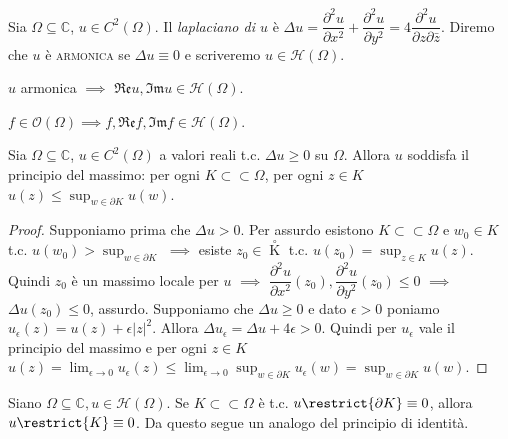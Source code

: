 \begin{defn}
  Sia $\Omega \subseteq \mathbb{C}$, $u \in C^2(\Omega)$. Il \textit{laplaciano di $u$} è $\Delta u=\dfrac{\partial^2 u}{\partial x^2}+\dfrac{\partial^2 u}{\partial y^2}=4\dfrac{\partial^2 u}{\partial z\partial\bar{z}}$.
  Diremo che $u$ è \textsc{armonica} se $\Delta u \equiv 0$ e scriveremo $u \in \mathcal{H}(\Omega)$.
\end{defn}

\begin{oss}
  $u$ armonica $\implies$ $\mathfrak{Re}u, \mathfrak{Im}u \in \mathcal{H}(\Omega)$.
\end{oss}

\begin{oss}
  $f \in \mathcal{O}(\Omega) \implies f, \mathfrak{Re}f, \mathfrak{Im}f \in \mathcal{H}(\Omega)$.
\end{oss}

\begin{prop}
  Sia $\Omega \subseteq \mathbb{C}$, $u \in C^2(\Omega)$ a valori reali t.c. $\Delta u \ge 0$ su $\Omega$. Allora $u$ soddisfa il principio del massimo: per ogni $K \subset\subset \Omega$, per ogni $z \in K$ $\displaystyle u(z) \le \sup_{w \in \partial K} u(w)$.
\end{prop}

\begin{proof}
  Supponiamo prima che $\Delta u>0$. Per assurdo esistono $K\subset\subset\Omega$ e $w_0 \in K$ t.c. $\displaystyle u(w_0)>\sup_{w \in \partial K}$ $\implies$ esiste $z_0 \in \mathop K\limits^ \circ$ t.c. $\displaystyle u(z_0)=\sup_{z \in K} u(z)$.
  Quindi $z_0$ è un massimo locale per $u$ $\implies$ $\dfrac{\partial^2 u}{\partial x^2}(z_0), \dfrac{\partial^2 u}{\partial y^2}(z_0) \le 0$ $\implies$ $\Delta u(z_0) \le 0$, assurdo.
  Supponiamo che $\Delta u \ge 0$ e dato $\epsilon>0$ poniamo $u_\epsilon(z)=u(z)+\epsilon|z|^2$. Allora $\Delta u_\epsilon=\Delta u +4\epsilon>0$. Quindi per $u_\epsilon$ vale il principio del massimo e per ogni $z \in K$ $\displaystyle u(z)=\lim_{\epsilon \longrightarrow 0} u_\epsilon(z) \le \lim_{\epsilon \longrightarrow 0} \sup_{w \in \partial K} u_\epsilon(w)=\sup_{w \in \partial K} u(w)$.
\end{proof}

\begin{cor} \label{id_armo}
  Siano $\Omega \subseteq \mathbb{C}, u \in \mathcal{H}(\Omega)$. Se $K \subset\subset \Omega$ è t.c. $u\restrict{\partial K} \equiv 0$, allora $u\restrict{K} \equiv 0$. Da questo segue un analogo del principio di identità.
\end{cor}

